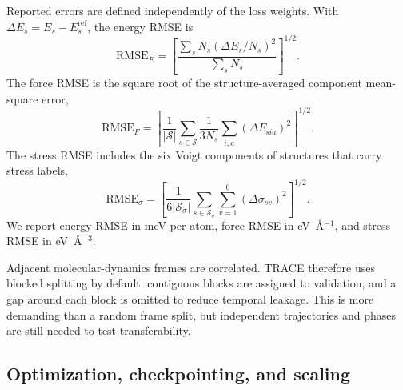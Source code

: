 \documentclass[aps,prx,preprint,notitlepage,superscriptaddress,nofootinbib,floatfix]{revtex4-2}
\begin{document}
Reported errors are defined independently of the loss
weights. With $\Delta E_s=E_s-E_s^{\mathrm{ref}}$, the energy RMSE is
\begin{equation}
 \mathrm{RMSE}_E=
 \left[\frac{\sum_s N_s(\Delta E_s/N_s)^2}{\sum_sN_s}\right]^{1/2}.
 \label{eq:energy-metric}
\end{equation}
The force RMSE is the square root of the structure-averaged component mean-square error,
\begin{equation}
 \mathrm{RMSE}_F=
 \left[\frac{1}{|\mathcal S|}\sum_{s\in\mathcal S}\frac{1}{3N_s}
 \sum_{i,a}(\Delta F_{sia})^2\right]^{1/2}.
 \label{eq:force-metric}
\end{equation}
The stress RMSE includes the six Voigt components of
structures that carry stress labels,
\begin{equation}
 \mathrm{RMSE}_\sigma=
 \left[\frac{1}{6|\mathcal S_\sigma|}
 \sum_{s\in\mathcal S_\sigma}\sum_{v=1}^{6}
 (\Delta\sigma_{sv})^2\right]^{1/2}.
 \label{eq:stress-metric}
\end{equation}
We report energy RMSE in meV per atom, force RMSE in eV~\AA$^{-1}$, and stress RMSE in eV~\AA$^{-3}$.

Adjacent molecular-dynamics frames are correlated. TRACE
therefore uses blocked splitting by default: contiguous blocks are assigned to
validation, and a gap around each block is omitted to reduce temporal leakage.
This is more demanding than a random frame split, but independent trajectories
and phases are still needed to test transferability. 

\subsection{Optimization, checkpointing, and scaling}
\end{document}

